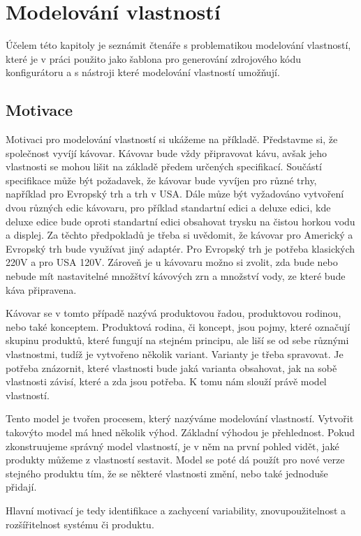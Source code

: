 \chapter{Modelování vlastností}

Účelem této kapitoly je seznámit čtenáře s problematikou modelování vlastností, které je v práci použito jako šablona pro generování zdrojového kódu konfigurátoru a s nástroji které modelování vlastností umožňují.

\section{Motivace}

Motivaci pro modelování vlastností si ukážeme na příkladě. Představme si, že společnost vyvíjí kávovar. Kávovar bude vždy připravovat kávu, avšak jeho vlastnosti se mohou lišit na základě předem určených specifikací. Součástí specifikace může být požadavek, že kávovar bude vyvíjen pro různé trhy, například pro Evropský trh a trh v USA. Dále můze být vyžadováno vytvoření dvou různých edic kávovaru, pro příklad standartní edici a deluxe edici, kde deluxe edice bude oproti standartní edici obsahovat trysku na čistou horkou vodu a displej. Za těchto předpokladů je třeba si uvědomit, že kávovar pro Americký a Evropský trh bude využívat jiný adaptér. Pro Evropský trh je potřeba klasických 220V a pro USA 120V. Zároveň je u kávovaru možno si zvolit, zda bude nebo nebude mít nastavitelné množštví kávových zrn a množství vody, ze které bude káva připravena.

Kávovar se v tomto případě nazývá produktovou řadou, produktovou rodinou, nebo také konceptem. Produktová rodina, či koncept, jsou pojmy, které označují skupinu produktů, které fungují na stejném principu, ale liší se od sebe různými vlastnostmi, tudíž je vytvořeno několik variant. Varianty je třeba spravovat. Je potřeba znázornit, které vlastnosti bude jaká varianta obsahovat, jak na sobě vlastnosti závisí, které a zda jsou potřeba. K tomu nám slouží právě model vlastností.

Tento model je tvořen procesem, který nazýváme modelování vlastností. Vytvořit takovýto model má hned několik výhod. Základní výhodou je přehlednost. Pokud zkonstruujeme správný model vlastností, je v něm na první pohled vidět, jaké produkty můžeme z vlastností sestavit. Model se poté dá použít pro nové verze stejného produktu tím, že se některé vlastnosti změní, nebo také jednoduše přidají.

Hlavní motivací je tedy identifikace a zachycení variability, znovupoužitelnost a rozšířitelnost systému či produktu.


